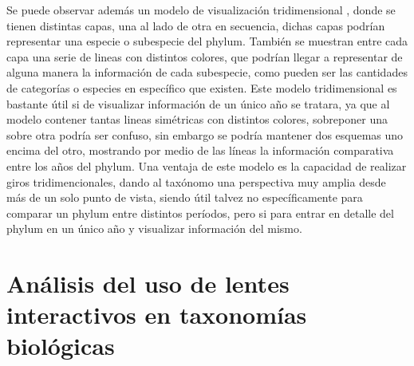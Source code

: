 \documentclass[journal]{IEEEtran}
\begin{document}
Se puede observar además un modelo de visualización tridimensional \cite{phylo-scheme}, donde se tienen distintas capas, una al lado de otra en secuencia, dichas capas podrían representar una especie o subespecie del phylum. También se muestran entre cada capa una serie de lineas con distintos colores, que podrían llegar a representar de alguna manera la información de cada subespecie, como pueden ser las cantidades de categorías o especies en específico que existen. Este modelo tridimensional es bastante útil si de visualizar información de un único año se tratara, ya que al modelo contener tantas lineas simétricas con distintos colores, sobreponer una sobre otra podría ser confuso, sin embargo se podría mantener dos esquemas uno encima del otro, mostrando por medio de las líneas la información comparativa entre los años del phylum. Una ventaja de este modelo es la capacidad de realizar giros tridimencionales, dando al taxónomo una perspectiva muy amplia desde más de un solo punto de vista, siendo útil talvez no específicamente para comparar un phylum entre distintos períodos, pero si para entrar en detalle del phylum en un único año y visualizar información del mismo.


\section{Análisis del uso de lentes interactivos en taxonomías biológicas}
\end{document}
